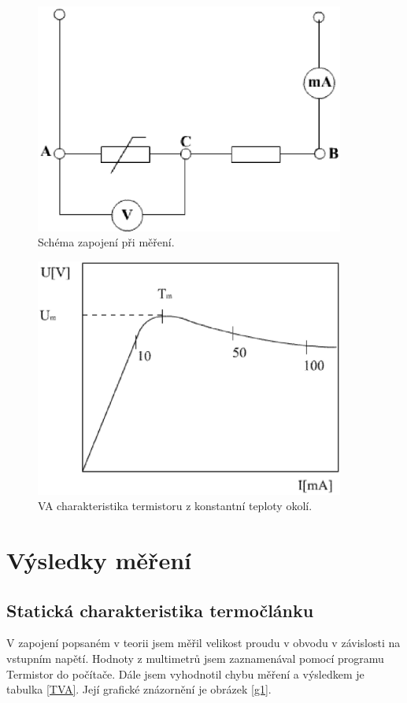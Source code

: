 \documentclass[a4paper,12pt]{article}
\begin{document}
\begin{figure}
\begin{center}
\includegraphics[width=4in]{sch1.eps}
\end{center}
\caption{Schéma zapojení při měření.}
\label{sch1}
\end{figure}

\begin{figure}
\begin{center}
\includegraphics[width=4in]{VA.eps}
\end{center}
\caption{VA charakteristika termistoru z konstantní teploty okolí.}
\label{VA}
\end{figure}

\section{Výsledky měření}

\subsection{Statická charakteristika termočlánku}
V zapojení popsaném v teorii jsem měřil velikost proudu v obvodu v závislosti na vstupním napětí. 
Hodnoty z multimetrů jsem zaznamenával pomocí programu Termistor do počítače. Dále jsem vyhodnotil 
chybu měření a výsledkem je tabulka \ref{TVA}. Její grafické znázornění je obrázek \ref{g1}.
\end{document}
